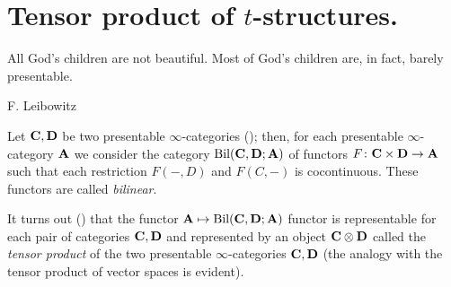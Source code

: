 \section{Tensor product of $t$\hyp{}structures.}\label{tens.of.tee}
\epigraph{All God's children are not beautiful. Most of God's children are, in fact, barely presentable.}{F\@. Leibowitz}
Let $\textbf{C},\textbf{D}$ be two presentable $\infty$\hyp{}categories (\cite[\achap \textbf{5}]{HTT}); then, for each presentable $\infty$\hyp{}category $\textbf{A}$ we consider the category $\text{Bil}(\textbf{C},\textbf{D};\textbf{A})$ of functors $F\colon \textbf{C}\times \textbf{D} \to \textbf{A}$ such that each restriction $F(-,D)$ and $F(C,-)$ is cocontinuous. These functors are called \emph{bilinear}.

It turns out (\cite{Gro,LurieHA,LurieSAG}) that the functor $\textbf{A}\mapsto \text{Bil}(\textbf{C},\textbf{D};\textbf{A})$ functor is representable for each pair of categories $\textbf{C},\textbf{D}$ and represented by an object $\textbf{C}\otimes \textbf{D}$ called the \emph{tensor product} of the two presentable $\infty$\hyp{}categories $\textbf{C},\textbf{D}$ (the analogy with the tensor product of vector spaces is evident).

